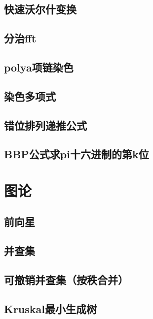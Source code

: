 \section{快速沃尔什变换}
\raggedbottom
\hrulefill
\section{分治fft}
\raggedbottom
\hrulefill
\section{polya项链染色}
\raggedbottom
\hrulefill
\section{染色多项式}
\raggedbottom
\hrulefill
\section{	错位排列递推公式}
\raggedbottom
\hrulefill
\section{BBP公式求pi十六进制的第k位}
\raggedbottom
\hrulefill

\chapter{图论}
\section{前向星}
\raggedbottom
\hrulefill
\section{并查集}
\raggedbottom
\hrulefill
\section{可撤销并查集（按秩合并）}
\raggedbottom
\hrulefill
\section{Kruskal最小生成树}
\raggedbottom
\hrulefill
